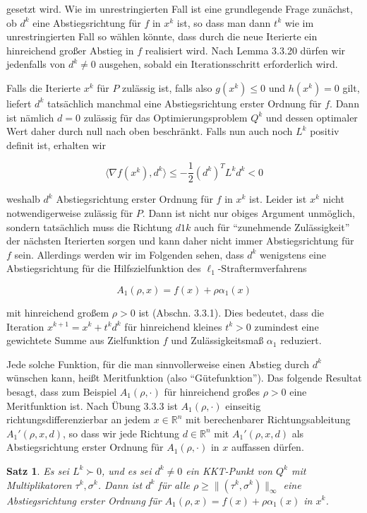\documentclass[11pt]{scrreprt}
\newcounter{thm}
\theoremstyle{thmstyle}
\numberwithin{thm}{section}
\newtheorem{satz}[thm]{Satz}
\begin{document}
gesetzt wird. Wie im unrestringierten Fall ist eine grundlegende Frage zunächst, ob $d^k$ eine Abstiegsrichtung für $f$ in $x^k$ ist, so dass man dann $t^k$ wie im unrestringierten Fall so wählen könnte, dass durch die neue Iterierte ein hinreichend großer Abstieg in $f$ realisiert wird. Nach Lemma 3.3.20 dürfen wir jedenfalls von $d^k \neq 0$ ausgehen, sobald ein Iterationsschritt erforderlich wird. ~\bigskip

Falls die Iterierte $x^k$ für $P$ zulässig ist, falls also $g(x^k) \leq 0$ und $h(x^k) = 0$ gilt, liefert $d^k$ tatsächlich manchmal eine Abstiegsrichtung erster Ordnung für $f$. Dann ist nämlich $d = 0$ zulässig für das Optimierungsproblem $Q^k$ und dessen optimaler Wert daher durch null nach oben beschränkt. Falls nun auch noch $L^k$ positiv definit ist, erhalten wir

	$$ \langle \nabla f(x^k) , d^k \rangle \leq - \frac{1}{2} (d^k)^T L^k d^k < 0 $$
	
weshalb $d^k$ Abstiegsrichtung erster Ordnung für $f$ in $x^k$ ist. Leider ist $x^k$ nicht notwendigerweise zulässig für $P$. Dann ist nicht nur obiges Argument unmöglich, sondern tatsächlich muss die Richtung $d1k$ auch für \enquote{zunehmende Zulässigkeit} der nächsten Iterierten sorgen und kann daher nicht immer Abstiegsrichtung für $f$ sein. Allerdings werden wir im Folgenden sehen, dass $d^k$ wenigstens eine Abstiegsrichtung für die Hilfszielfunktion des $\ell_1$-Straftermverfahrens

	$$ A_1(\rho, x) = f(x) + \rho \alpha_1(x) $$

mit hinreichend großem $\rho > 0$ ist (Abschn. 3.3.1). Dies bedeutet, dass die Iteration $x^{k + 1} = x^k + t^k d^k$ für hinreichend kleines $t^k > 0$ zumindest eine gewichtete Summe aus Zielfunktion $f$ und Zulässigkeitsmaß $\alpha_1$ reduziert. ~\bigskip

Jede solche Funktion, für die man sinnvollerweise einen Abstieg durch $d^k$ wünschen kann, heißt Meritfunktion (also \enquote{Gütefunktion}). Das folgende Resultat besagt, dass zum Beispiel $A_1(\rho, \cdot)$ für hinreichend großes $\rho > 0$ eine Meritfunktion ist. Nach Übung 3.3.3 ist $A_1(\rho, \cdot)$ einseitig richtungsdifferenzierbar an jedem $x \in \mathbb{R}^n$ mit berechenbarer Richtungsableitung $A_1'(\rho, x, d)$, so dass wir jede Richtung $d \in \mathbb{R}^n$ mit $A_1'(\rho, x, d)$ als Abstiegsrichtung erster Ordnung für $A_1(\rho, \cdot)$ in $x$ auffassen dürfen.

\begin{satz}
	Es sei $L^k \succ 0$, und es sei $d^k \neq 0$ ein KKT-Punkt von $Q^k$ mit Multiplikatoren $\tau^k, \sigma^k$. Dann ist $d^k$ für alle $\rho \geq \|(\tau^k, \sigma^k) \|_{\infty}$ eine Abstiegsrichtung erster Ordnung für $A_1 (\rho, x) = f(x) + \rho \alpha_1(x)$ in $x^k$.
\end{satz}
\end{document}
